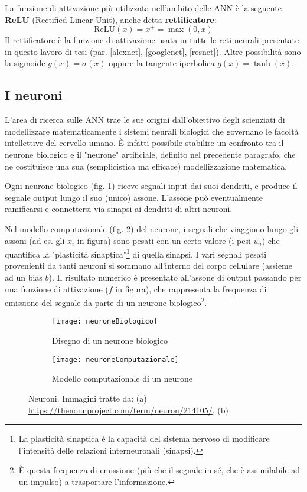 La funzione di attivazione più utilizzata nell'ambito delle ANN è la seguente \textbf{ReLU} (Rectified Linear Unit), anche detta \textbf{rettificatore}:
\[\text{ReLU}(x)=x^{+}=\max(0,x)\]
Il rettificatore è la funzione di attivazione usata in tutte le reti neurali presentate in questo lavoro di tesi (par. \ref{alexnet}, \ref{googlenet}, \ref{resnet}).
Altre possibilità sono la sigmoide $g(x)=\sigma(x)$ oppure la tangente iperbolica $g(x)=\tanh(x)$.\\

\subsection{I neuroni}
\label{neuroni}
L'area di ricerca sulle ANN trae le sue origini dall'obiettivo degli scienziati di modellizzare matematicamente i sistemi neurali biologici che governano le facoltà intellettive del cervello umano.
È infatti possibile stabilire un confronto tra il neurone biologico e il "neurone" artificiale, definito nel precedente paragrafo, che ne costituisce una sua (semplicistica ma efficace) modellizzazione matematica.

Ogni neurone biologico (fig. \ref{fig:neuroneBiologico}) riceve segnali input dai suoi dendriti, e produce il segnale output lungo il suo (unico) assone. L'assone può eventualmente ramificarsi e connettersi via sinapsi ai dendriti di altri neuroni.

Nel modello computazionale (fig. \ref{fig:neuroneComputazionale}) del neurone, i segnali che viaggiono lungo gli assoni (ad es. gli $x_i$ in figura) sono pesati con un certo valore (i pesi $w_i$) che quantifica la "plasticità sinaptica"\footnote{La plasticità sinaptica è la capacità del sistema nervoso di modificare l'intensità delle relazioni interneuronali (sinapsi).} di quella sinapsi. I vari segnali pesati provenienti da tanti neuroni si sommano all'interno del corpo cellulare (assieme ad un bias $b$). Il risultato numerico è presentato all'assone di output passando per una funzione di attivazione ($f$ in figura), che rappresenta la frequenza di emissione del segnale da parte di un neurone biologico\footnote{È questa frequenza di emissione (più che il segnale in sé, che è assimilabile ad un impulso) a trasportare l'informazione.}.

\begin{figure}[h]
\centering
\begin{subfigure}[b]{0.48\textwidth}
\texttt{[image: neuroneBiologico]}
\caption{Disegno di un neurone biologico}
\label{fig:neuroneBiologico}
\end{subfigure}
\begin{subfigure}[b]{0.48\textwidth}
\texttt{[image: neuroneComputazionale]}
\caption{Modello computazionale di un neurone}
\label{fig:neuroneComputazionale}
\end{subfigure}
\caption{Neuroni. Immagini tratte da: (a) \protect\url{https://thenounproject.com/term/neuron/214105/}, (b) \cite{cs231n}}
\label{fig:neurone}
\end{figure}

